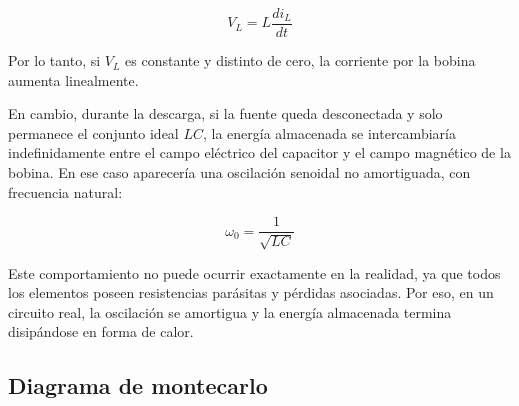 \[
V_L = L \frac{di_L}{dt}
\]

Por lo tanto, si $V_L$ es constante y distinto de cero, la corriente por la bobina aumenta linealmente.

En cambio, durante la descarga, si la fuente queda desconectada y solo permanece el conjunto ideal $LC$, la energía almacenada se intercambiaría indefinidamente entre el campo eléctrico del capacitor y el campo magnético de la bobina. En ese caso aparecería una oscilación senoidal no amortiguada, con frecuencia natural:

\[
\omega_0 = \frac{1}{\sqrt{LC}}
\]

Este comportamiento no puede ocurrir exactamente en la realidad, ya que todos los elementos poseen resistencias parásitas y pérdidas asociadas. Por eso, en un circuito real, la oscilación se amortigua y la energía almacenada termina disipándose en forma de calor.

\subsection{Diagrama de montecarlo}